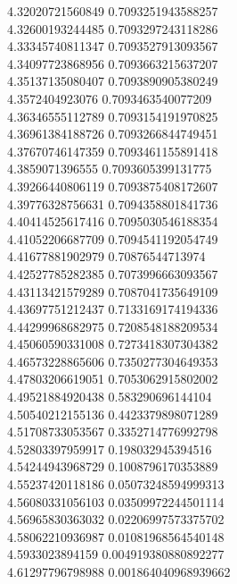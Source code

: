 {4.32020721560849 0.7093251943588257 \\
4.32600193244485 0.7093297243118286 \\
4.33345740811347 0.7093527913093567 \\
4.34097723868956 0.7093663215637207 \\
4.35137135080407 0.7093890905380249 \\
4.3572404923076 0.7093463540077209 \\
4.36346555112789 0.7093154191970825 \\
4.36961384188726 0.7093266844749451 \\
4.37670746147359 0.7093461155891418 \\
4.3859071396555 0.7093605399131775 \\
4.39266440806119 0.7093875408172607 \\
4.39776328756631 0.7094358801841736 \\
4.40414525617416 0.7095030546188354 \\
4.41052206687709 0.7094541192054749 \\
4.41677881902979 0.70876544713974 \\
4.42527785282385 0.7073996663093567 \\
4.43113421579289 0.7087041735649109 \\
4.43697751212437 0.7133169174194336 \\
4.44299968682975 0.7208548188209534 \\
4.45060590331008 0.7273418307304382 \\
4.46573228865606 0.7350277304649353 \\
4.47803206619051 0.7053062915802002 \\
4.49521884920438 0.583290696144104 \\
4.50540212155136 0.4423379898071289 \\
4.51708733053567 0.3352714776992798 \\
4.52803397959917 0.198032945394516 \\
4.54244943968729 0.1008796170353889 \\
4.55237420118186 0.05073248594999313 \\
4.56080331056103 0.03509972244501114 \\
4.56965830363032 0.02206997573375702 \\
4.58062210936987 0.01081968564540148 \\
4.5933023894159 0.004919380880892277 \\
4.61297796798988 0.001864040968939662 \\
}
